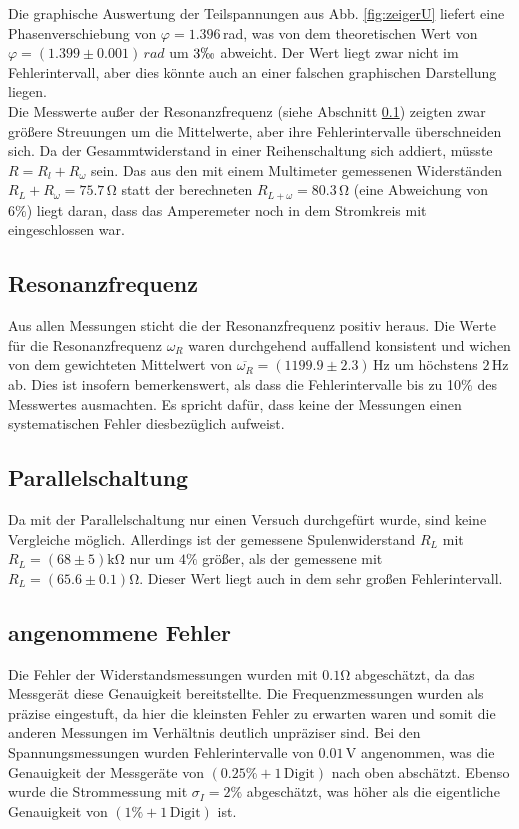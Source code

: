 \documentclass[12pt,a4paper,titlepage,headinclude,bibtotoc]{scrartcl}
\begin{document}
Die graphische Auswertung der Teilspannungen aus Abb. \ref{fig:zeigerU} liefert eine Phasenverschiebung von $\varphi=1.396\,$rad, was von dem theoretischen Wert von $\varphi=(1.399 \pm 0.001)\,\si{rad}$ um $3\permil$ abweicht.
Der Wert liegt zwar nicht im Fehlerintervall, aber dies könnte auch an einer falschen graphischen Darstellung liegen.\\

Die Messwerte außer der Resonanzfrequenz (siehe Abschnitt \ref{sec:resodisku}) zeigten zwar größere Streuungen um die Mittelwerte, aber ihre Fehlerintervalle überschneiden sich.
Da der Gesammtwiderstand in einer Reihenschaltung sich addiert, müsste $R=R_l+R_\omega$ sein.
Das aus den mit einem Multimeter gemessenen Widerständen $R_L+R_\omega=75.7\,\si\ohm$ statt der berechneten $R_{L+\omega}=80.3\,\si\ohm$ (eine Abweichung von 6\%) liegt daran, dass das Amperemeter noch in dem Stromkreis mit eingeschlossen war.


\subsection{Resonanzfrequenz}
\label{sec:resodisku}
Aus allen Messungen sticht die der Resonanzfrequenz positiv heraus.
Die Werte für die Resonanzfrequenz $\omega_R$ waren durchgehend auffallend konsistent und wichen von dem gewichteten Mittelwert von $\overline{\omega_R}=(1199.9\pm2.3)\,\si\hertz$ um höchstens $2\,\si\hertz$ ab.
Dies ist insofern bemerkenswert, als dass die Fehlerintervalle bis zu 10\% des Messwertes ausmachten.
Es spricht dafür, dass keine der Messungen einen systematischen Fehler diesbezüglich aufweist.

\subsection{Parallelschaltung}
Da mit der Parallelschaltung nur einen Versuch durchgefürt wurde, sind keine Vergleiche möglich.
Allerdings ist der gemessene Spulenwiderstand $R_L$ mit $R_L=(68\pm 5)\si{\kilo\ohm}$ nur um $4\%$ größer, als der gemessene mit $R_L=(65.6\pm0.1)\si\ohm$.
Dieser Wert liegt auch in dem sehr großen Fehlerintervall.

\subsection{angenommene Fehler}
Die Fehler der Widerstandsmessungen wurden mit $0.1\si\ohm$ abgeschätzt, da das Messgerät diese Genauigkeit bereitstellte.
Die Frequenzmessungen wurden als präzise eingestuft, da hier die kleinsten Fehler zu erwarten waren und somit die anderen Messungen im Verhältnis deutlich unpräziser sind.
Bei den Spannungsmessungen wurden Fehlerintervalle von $0.01\,\si\volt$ angenommen, was die Genauigkeit der Messgeräte von $(0.25\%+1\,\text{Digit})$ nach oben abschätzt.
Ebenso wurde die Strommessung mit $\sigma_I=2\%$ abgeschätzt, was höher als die eigentliche Genauigkeit von $(1\%+1\,\text{Digit})$ ist.




\end{document}
